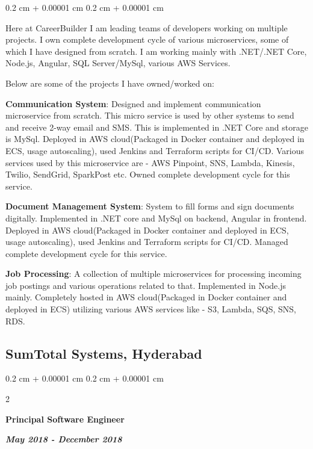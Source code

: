 \documentclass[10pt, letterpaper]{article}
\newenvironment{highlights}{
    \begin{itemize}[
        topsep=0.10 cm,
        parsep=0.10 cm,
        partopsep=0pt,
        itemsep=0pt,
        leftmargin=0.4 cm + 10pt
    ]
}{
    \end{itemize}
} %
\newenvironment{onecolentry}{
    \begin{adjustwidth}{
        0.2 cm + 0.00001 cm
    }{
        0.2 cm + 0.00001 cm
    }
}{
    \end{adjustwidth}
} %
\newenvironment{twocolentry}[2][]{
    \onecolentry
    \def\secondColumn{#2}
    \setcolumnwidth{\fill, 6.0 cm}
    \begin{paracol}{2}
}{
    \switchcolumn \raggedleft \secondColumn
    \end{paracol}
    \endonecolentry
} %
\begin{document}
            \begin{onecolentry}
                \begin{highlights}
                    Here at CareerBuilder I am leading teams of developers working on multiple projects. I own complete development cycle of various microservices, some of which I have designed from scratch. I am working mainly with .NET/.NET Core, Node.js, Angular, SQL Server/MySql, various AWS Services.

                    Below are some of the projects I have owned/worked on:

                    \textbf{Communication System}: Designed and implement communication microservice from scratch. This micro service is used by other systems to send and receive 2-way email and SMS. This is implemented in .NET Core and storage is MySql. Deployed in AWS cloud(Packaged in Docker container and deployed in ECS, usage autoscaling), used Jenkins and Terraform scripts for CI/CD. Various services used by this microservice are - AWS Pinpoint, SNS, Lambda, Kinesis, Twilio, SendGrid, SparkPost etc. Owned complete development cycle for this service.

                    \textbf{Document Management System}: System to fill forms and sign documents digitally. Implemented in .NET core and MySql on backend, Angular in frontend. Deployed in AWS cloud(Packaged in Docker container and deployed in ECS, usage autoscaling), used Jenkins and Terraform scripts for CI/CD. Managed complete development cycle for this service.

                    \textbf{Job Processing}: A collection of multiple microservices for processing incoming job postings and various operations related to that. Implemented in Node.js mainly. Completely hosted in AWS cloud(Packaged in Docker container and deployed in ECS) utilizing various AWS services like - S3, Lambda, SQS, SNS, RDS.
                \end{highlights}
            \end{onecolentry}
        
        
        \subsection{SumTotal Systems, Hyderabad}
            \begin{twocolentry}{  
                \textit{\textbf{May 2018 - December 2018}}}
                \textbf{Principal Software Engineer}
            \end{twocolentry}
\end{document}
